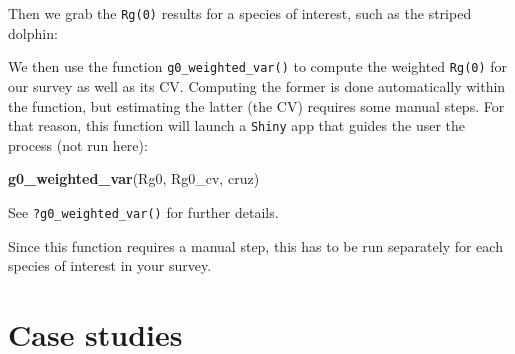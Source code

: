 \documentclass[
]{book}
\newenvironment{Shaded}{\begin{snugshade}}{\end{snugshade}}
\newcommand{\DecValTok}[1]{\textcolor[rgb]{0.00,0.00,0.81}{#1}}
\newcommand{\FloatTok}[1]{\textcolor[rgb]{0.00,0.00,0.81}{#1}}
\newcommand{\KeywordTok}[1]{\textcolor[rgb]{0.13,0.29,0.53}{\textbf{#1}}}
\newcommand{\NormalTok}[1]{#1}
\newcommand{\OperatorTok}[1]{\textcolor[rgb]{0.81,0.36,0.00}{\textbf{#1}}}
\newcommand{\StringTok}[1]{\textcolor[rgb]{0.31,0.60,0.02}{#1}}
\begin{document}
Then we grab the \texttt{Rg(0)} results for a species of interest, such as the striped dolphin:

\begin{Shaded}
\end{Shaded}

We then use the function \texttt{g0\_weighted\_var()} to compute the weighted \texttt{Rg(0)} for our survey as well as its CV. Computing the former is done automatically within the function, but estimating the latter (the CV) requires some manual steps. For that reason, this function will launch a \texttt{Shiny} app that guides the user the process (not run here):

\begin{Shaded}
\begin{Highlighting}[]
\KeywordTok{g0_weighted_var}\NormalTok{(Rg0, Rg0_cv, cruz)}
\end{Highlighting}
\end{Shaded}

See \texttt{?g0\_weighted\_var()} for further details.

Since this function requires a manual step, this has to be run separately for each species of interest in your survey.

\hypertarget{part-case-studies}{%
\part{Case studies}\label{part-case-studies}}
\end{document}
